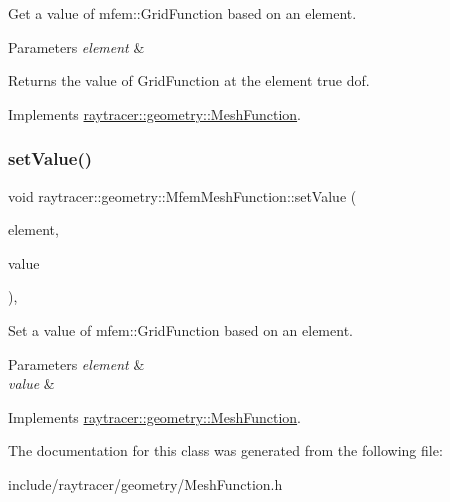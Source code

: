 Get a value of mfem\+::\+Grid\+Function based on an element. 


\begin{DoxyParams}{Parameters}
{\em element} & \\
\hline
\end{DoxyParams}
\begin{DoxyReturn}{Returns}
the value of Grid\+Function at the element true dof. 
\end{DoxyReturn}


Implements \hyperlink{classraytracer_1_1geometry_1_1MeshFunction_a8e8a42e0d1793e48146ac7aaf98026c4}{raytracer\+::geometry\+::\+Mesh\+Function}.

\mbox{\label{classraytracer_1_1geometry_1_1MfemMeshFunction_a3153afe8fbdf71f1f5f7d7a44c507536}} 
\subsubsection{\texorpdfstring{set\+Value()}{setValue()}}
{\footnotesize\ttfamily void raytracer\+::geometry\+::\+Mfem\+Mesh\+Function\+::set\+Value (\begin{DoxyParamCaption}\item[{const \hyperlink{classraytracer_1_1geometry_1_1Element}{Element} \&}]{element,  }\item[{double}]{value }\end{DoxyParamCaption})\hspace{0.3cm}{\ttfamily [override]}, {\ttfamily [virtual]}}



Set a value of mfem\+::\+Grid\+Function based on an element. 


\begin{DoxyParams}{Parameters}
{\em element} & \\
\hline
{\em value} & \\
\hline
\end{DoxyParams}


Implements \hyperlink{classraytracer_1_1geometry_1_1MeshFunction_a9e677af2a48d1b372b19fd6462612744}{raytracer\+::geometry\+::\+Mesh\+Function}.



The documentation for this class was generated from the following file\+:\begin{DoxyCompactItemize}
\item 
include/raytracer/geometry/Mesh\+Function.\+h\end{DoxyCompactItemize}
